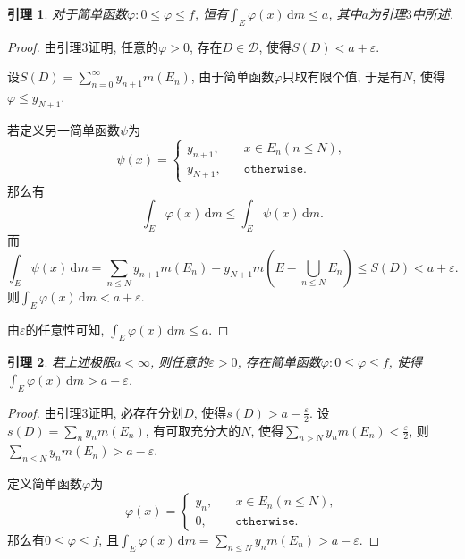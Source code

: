 \documentclass[12pt, a4paper, oneside]{ctexart}
\newtheorem{lemma}{引理}
\numberwithin{equation}{section}  %
\let\leq=\leqslant %
\def\d{\mathrm{d}}          %
\begin{document}
\begin{lemma}
    对于简单函数$\varphi:0\leq \varphi \leq f$, 恒有$\int_E\varphi(x)\,\d m\leq a$, 其中$a$为引理$3$中所述.
\end{lemma}
\begin{proof}
    由引理$3$证明, 任意的$\varphi>0$, 存在$D\in \mathcal{D}$, 使得$S(D) < a+\varepsilon$.

    设$S(D) = \sum_{n=0}^\infty y_{n+1}m(E_n)$, 由于简单函数$\varphi$只取有限个值, 于是有$N$, 使得$\varphi\leq y_{N+1}$.

    若定义另一简单函数$\psi$为
    \begin{equation*}
        \psi(x)=\begin{cases}
            y_{n+1},&\quad x\in E_n(n\leq N),\\
            y_{N+1},&\quad \mathtt{otherwise}.
        \end{cases}
    \end{equation*}
    那么有
    \begin{equation*}
        \int_E\varphi(x)\,\d m\leq \int_{E}\psi(x)\,\d m.
    \end{equation*}
    而
    \begin{equation*}
        \int_E\psi(x)\,\d m=\sum_{n\leq N}y_{n+1}m(E_n)+y_{N+1}m(E-\bigcup_{n\leq N}E_n)\leq S(D) <a+\varepsilon.
    \end{equation*}
    则$\int_{E}\varphi(x)\,\d m < a+\varepsilon$.

    由$\varepsilon$的任意性可知, $\int_E\varphi(x)\,\d m\leq a$.
\end{proof}
\begin{lemma}
    若上述极限$a<\infty$, 则任意的$\varepsilon >0$, 存在简单函数$\varphi:0\leq \varphi\leq f$, 使得$\int_{E}\varphi(x)\,\d m > a-\varepsilon$.
\end{lemma}
\begin{proof}
    由引理$3$证明, 必存在分划$D$, 使得$s(D) > a-\frac{\varepsilon}{2}$. 设$s(D) = \sum_{n}y_nm(E_n)$, 有可取充分大的$N$, 使得$\sum_{n > N}y_nm(E_n) < \frac{\varepsilon}{2}$, 则$\sum_{n \leq N}y_nm(E_n)>a-\varepsilon$.

    定义简单函数$\varphi$为
    \begin{equation*}
        \varphi(x)= \begin{cases}
            y_n,&\quad x\in E_n(n\leq N),\\
            0,&\quad \mathtt{otherwise}.
        \end{cases}
    \end{equation*}
    那么有$0\leq \varphi\leq f$, 且$\int_E\varphi(x)\,\d m=\sum_{n\leq N}y_nm(E_n) > a-\varepsilon$.
\end{proof}
\end{document}

